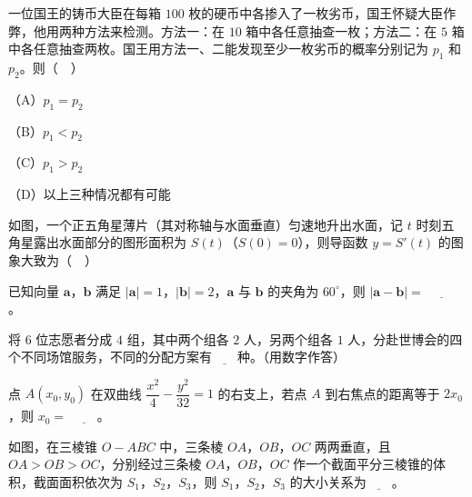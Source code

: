 \endgroup
\begin{question}
一位国王的铸币大臣在每箱 $100$ 枚的硬币中各掺入了一枚劣币，国王怀疑大臣作弊，他用两种方法来检测。方法一：在 $10$ 箱中各任意抽查一枚；方法二：在 $5$ 箱中各任意抽查两枚。国王用方法一、二能发现至少一枚劣币的概率分别记为 $p_1$ 和 $p_2$。则（　）

（A）$p_1=p_2$

（B）$p_1<p_2$

（C）$p_1>p_2$

（D）以上三种情况都有可能

\Needspace{0.4\textheight}
\end{question}
\begingroup
\renewenvironment{question}{\Needspace{0.5\textheight}}{}
\begin{question}
如图，一个正五角星薄片（其对称轴与水面垂直）匀速地升出水面，记 $t$ 时刻五角星露出水面部分的图形面积为 $S(t)$（$S(0)=0$），则导函数 $y=S'(t)$ 的图象大致为（　）
\nopagebreak[4]
\begin{center}\end{center}
\nopagebreak[4]
\end{question}
\endgroup
{}

\begin{question}
已知向量 $\boldsymbol a$，$\boldsymbol b$ 满足 $|\boldsymbol a|=1$，$|\boldsymbol b|=2$，$\boldsymbol a$ 与 $\boldsymbol b$ 的夹角为 $60^\circ$，则 $|\boldsymbol a-\boldsymbol b|=$ $\underline{\qquad}$。

\end{question}
\begin{question}
将 $6$ 位志愿者分成 $4$ 组，其中两个组各 $2$ 人，另两个组各 $1$ 人，分赴世博会的四个不同场馆服务，不同的分配方案有$\underline{\qquad}$种。（用数字作答）

\end{question}
\begin{question}
点 $A(x_0,y_0)$ 在双曲线 $\dfrac{x^2}{4}-\dfrac{y^2}{32}=1$ 的右支上，若点 $A$ 到右焦点的距离等于 $2x_0$，则 $x_0=$ $\underline{\qquad}$。

\Needspace{0.4\textheight}
\end{question}
\begingroup
\renewenvironment{question}{\Needspace{0.5\textheight}}{}
\begin{question}
如图，在三棱锥 $O-ABC$ 中，三条棱 $OA$，$OB$，$OC$ 两两垂直，且 $OA>OB>OC$，分别经过三条棱 $OA$，$OB$，$OC$ 作一个截面平分三棱锥的体积，截面面积依次为 $S_1$，$S_2$，$S_3$，则 $S_1$，$S_2$，$S_3$ 的大小关系为$\underline{\qquad}$。
\nopagebreak[4]
\begin{center}\end{center}
\nopagebreak[4]
\end{question}
\endgroup
{}

